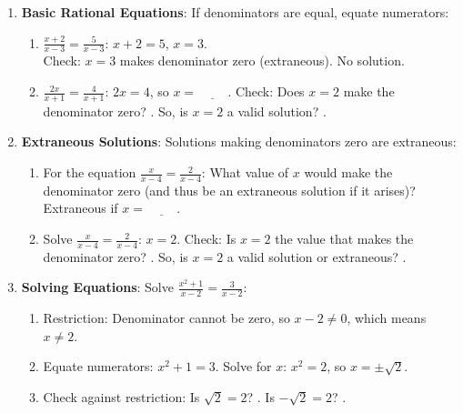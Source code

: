 \documentclass[12pt]{article}
\begin{document}
\begin{enumerate}[label=34.\arabic*]
    \item \textbf{Basic Rational Equations}: If denominators are equal, equate numerators:
    \begin{enumerate}[label=\alph*)]
        \item \( \frac{x + 2}{x - 3} = \frac{5}{x - 3} \): \( x + 2 = 5 \), \( x = 3 \). \\
        Check: \( x = 3 \) makes denominator zero (extraneous). No solution.
        \item \( \frac{2x}{x + 1} = \frac{4}{x + 1} \): \( 2x = 4 \), so \( x = \underline{\hspace{1cm}} \).
        Check: Does \(x=2\) make the denominator zero? \underline{\hspace{0.5cm}}. So, is \(x=2\) a valid solution? \underline{\hspace{0.5cm}}.
    \end{enumerate}
    \item \textbf{Extraneous Solutions}: Solutions making denominators zero are extraneous:
    \begin{enumerate}[label=\alph*)]
        \item For the equation \( \frac{x}{x - 4} = \frac{2}{x - 4} \): What value of \(x\) would make the denominator zero (and thus be an extraneous solution if it arises)? Extraneous if \( x = \underline{\hspace{1cm}} \).
        \item Solve \( \frac{x}{x - 4} = \frac{2}{x - 4} \): \( x = 2 \).
        Check: Is \(x=2\) the value that makes the denominator zero? \underline{\hspace{0.5cm}}. So, is \(x=2\) a valid solution or extraneous? \underline{\hspace{1.5cm}}.
    \end{enumerate}
    \item \textbf{Solving Equations}: Solve \( \frac{x^2 + 1}{x - 2} = \frac{3}{x - 2} \):
    \begin{enumerate}[label=\alph*)]
        \item Restriction: Denominator cannot be zero, so \( x - 2 \neq 0 \), which means \( x \neq 2 \).
        \item Equate numerators: \( x^2 + 1 = 3 \). Solve for \(x\): \( x^2 = 2 \), so \( x = \pm \sqrt{2} \).
        \item Check against restriction: Is \( \sqrt{2} = 2 \)? \underline{\hspace{0.5cm}}. Is \( -\sqrt{2} = 2 \)? \underline{\hspace{0.5cm}}.

\end{enumerate}
\end{enumerate}
\end{document}
